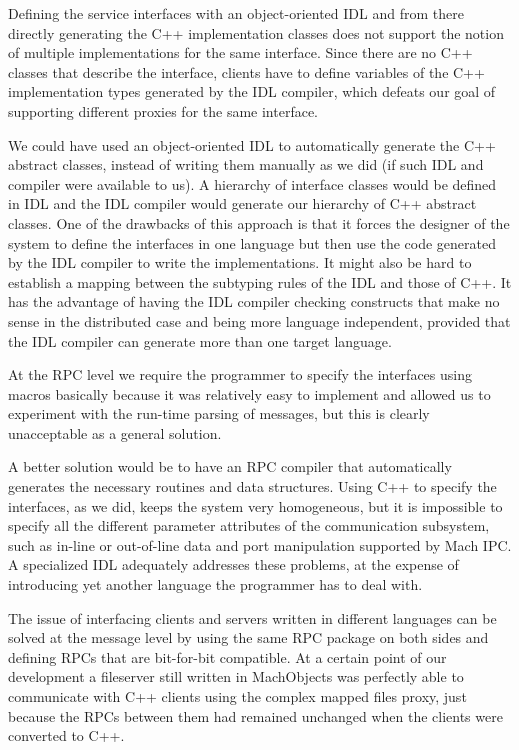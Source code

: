 Defining the service interfaces with an object-oriented IDL and from
there directly generating the C++ implementation classes does not
support the notion of multiple implementations for the same interface.
Since there are no C++ classes that describe the interface,
clients have to define variables of the C++ implementation types
generated by the IDL compiler, which defeats our goal of supporting
different proxies for the same interface.

We could have used an object-oriented IDL to automatically generate
the C++ abstract classes, instead of writing them manually as we did
(if such IDL and compiler were available to us).
A hierarchy of interface classes would be defined in IDL and 
the IDL compiler would generate our hierarchy of C++ abstract classes.
One of the drawbacks of this approach is that it forces the designer
of the system to define the interfaces in one language but then use
the code generated by the IDL compiler to write the implementations.
It might also be hard to establish a mapping between the subtyping rules
of the IDL and those of C++. It has the advantage of having the IDL
compiler checking constructs that make no sense in the distributed
case and being more language independent, provided that the IDL
compiler can generate more than one target language.

At the RPC level we require the programmer to specify the interfaces
using macros basically because it was relatively easy to implement and
allowed us to experiment with the run-time parsing of messages, but
this is clearly unacceptable as a general solution.

A better solution would be to have an RPC compiler that automatically
generates the necessary routines and data structures. Using C++ to
specify the interfaces, as we did, keeps the system very homogeneous,
but it is impossible to specify all the different parameter
attributes of the communication subsystem, such as in-line or
out-of-line data and port manipulation supported by Mach IPC. A
specialized IDL adequately addresses these problems, at the expense of
introducing yet another language the programmer has to deal with.

The issue of interfacing clients and servers written in different
languages can be solved at the message level by using the same RPC
package on both sides and defining RPCs that are bit-for-bit
compatible. At a certain point of our development a fileserver still
written in MachObjects was perfectly able to communicate with C++
clients using the complex mapped files proxy, just because the RPCs
between them had remained unchanged when the clients were converted to
C++.

